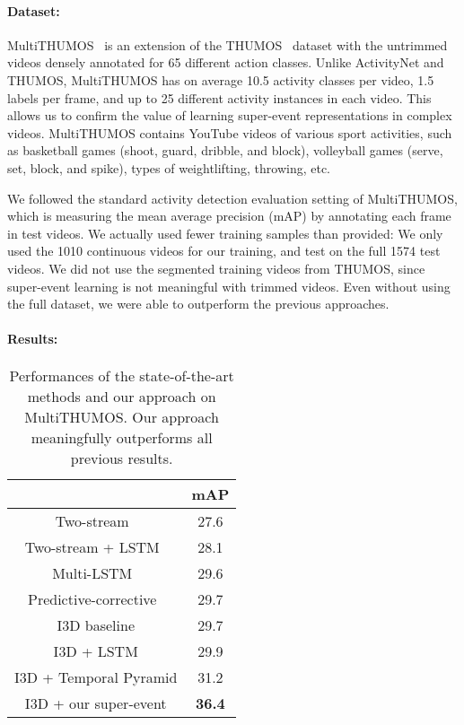 \documentclass[10pt,twocolumn,letterpaper]{article}
\begin{document}
\paragraph{Dataset:}
MultiTHUMOS~\cite{yeung2015every} is an extension of the THUMOS~\cite{THUMOS14} dataset with the untrimmed videos densely annotated for 65 different action classes. Unlike ActivityNet and THUMOS, MultiTHUMOS has on average 10.5 activity classes per video, 1.5 labels per frame, and up to 25 different activity instances in each video. This allows us to confirm the value of learning super-event representations in complex videos. MultiTHUMOS contains YouTube videos of various sport activities, such as basketball games (shoot, guard, dribble, and block), volleyball games (serve, set, block, and spike), types of weightlifting, throwing, etc.

We followed the standard activity detection evaluation setting of MultiTHUMOS, which is measuring the mean average precision (mAP) by annotating each frame in test videos. We actually used fewer training samples than provided: We only used the 1010 continuous videos for our training, and test on the full 1574 test videos. We did not use the segmented training videos from THUMOS, since super-event learning is not meaningful with trimmed videos. Even without using the full dataset, we were able to outperform the previous approaches. 

\vspace{-3pt}
\paragraph{Results:}

\begin{table}
\caption{Performances of the state-of-the-art methods and our approach on MultiTHUMOS. Our approach meaningfully outperforms all previous results.}
\label{res:multithumos}
\centering
\setlength\extrarowheight{0pt}
\begin{tabular}{c|c}
\hline
 & mAP \\
\hline
Two-stream~\cite{yeung2015every}    & 27.6\\
Two-stream + LSTM~\cite{yeung2015every}          & 28.1\\
Multi-LSTM~\cite{yeung2015every}    & 29.6\\
Predictive-corrective~\cite{dave2017predictive} & 29.7\\
I3D baseline                        & 29.7 \\
I3D + LSTM                          & 29.9 \\
I3D + Temporal Pyramid              & 31.2 \\
I3D + our super-event                    & \bf{36.4} \\
\hline
\end{tabular}
\end{table}
\end{document}
